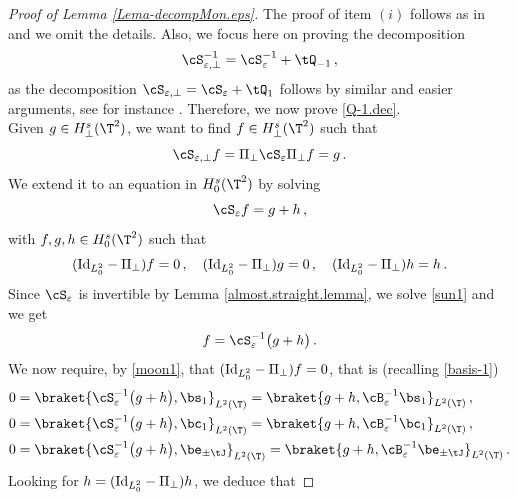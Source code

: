 \documentclass[a4paper,reqno,10pt]{article}
\begin{document}
\begin{proof}[Proof of Lemma \ref{Lema-decompMon.eps}] The proof of item $(i)$ follows as in \cite[Lemma 6.3]{HR21} and we omit the details. Also, we focus here on proving the decomposition
\begin{equation}\label{Q-1.dec}
    \cS_{\varepsilon,\perp}^{-1} = \cS_{\varepsilon}^{-1} + \tQ_{-1}\,, 
\end{equation}
as the decomposition $\cS_{\varepsilon,\perp} = \cS_{\varepsilon} + \tQ_{1}$ follows by similar and easier arguments, see for instance \cite[Lemma 6.3-$(i)$]{HR21}. Therefore, we now prove \eqref{Q-1.dec}.
\\[1mm]
	Given $g\in H_{\perp}^s(\T^2)$, we want to find $f \in H_{\perp}^s(\T^2)$ such that
	\begin{equation}
		\cS_{\varepsilon,\perp} f = \Pi_{\perp}  \cS_{\varepsilon} \Pi_{\perp} f = g \,.
	\end{equation}
	We extend it to an equation in $H_{0}^{s}(\T^2)$ by solving
	\begin{equation}\label{sun1}
		 \cS_{\varepsilon}f = g + h \,,
	\end{equation}
	with $f,g,h \in H_{0}^{s}(\T^2)$ such that
	\begin{equation}\label{moon1}
		({\rm Id}_{L_0^2} - \Pi_{\perp})f = 0 \,, \quad ({\rm Id}_{L_0^2} - \Pi_{\perp}) g = 0 \,, \quad ({\rm Id}_{L_0^2} - \Pi_{\perp}) h = h \,.
	\end{equation}
	Since $\cS_{\varepsilon}$ is invertible by Lemma \ref{almost.straight.lemma}, we solve \eqref{sun1} and  we get
	\begin{equation}\label{sun3}
		f= \cS_{\varepsilon}^{-1}\big( g+ h  \big)\,.
	\end{equation}
	We now require, by \eqref{moon1}, that $({\rm Id}_{L_0^2} - \Pi_{\perp})f = 0$, that is (recalling \eqref{basis-1})
    \begin{align}
        0 & = \braket{\cS_{\varepsilon}^{-1}\big( g + h \big), \bs_{1}}_{L^2(\T)}  = \braket{ g+h, \cB_{\varepsilon}^{-1}\bs_{1}}_{L^2(\T)}  \,, \\
        0 & = \braket{\cS_{\varepsilon}^{-1}\big( g+h\big), \bc_{1}}_{L^2(\T)}  = \braket{g+h , \cB_{\varepsilon}^{-1}\bc_{1}}_{L^2(\T)}   \,,  \\
        0 & = \braket{\cS_{\varepsilon}^{-1}\big( g+h\big), \be_{\pm \tJ}}_{L^2(\T)}  = \braket{g+h, \cB_{\varepsilon}^{-1}\be_{\pm\tJ}}_{L^2(\T)}  \,.
    \end{align}
	Looking for $h = ({\rm Id}_{L_0^2} - \Pi_{\perp})h$, we deduce that

\end{proof}
\end{document}
